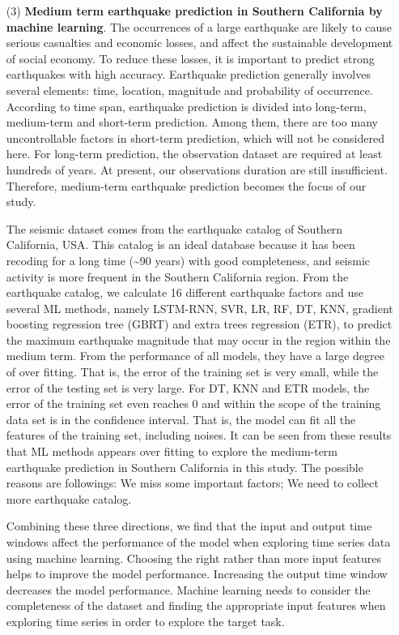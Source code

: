 \begin{enumerate}
  \item[(3)] \textbf{Medium term earthquake prediction in Southern California by machine learning}. The occurrences of a large earthquake are likely to cause serious casualties and economic losses, and affect the sustainable development of social economy. To reduce these losses, it is important to predict strong earthquakes with high accuracy. Earthquake prediction generally involves several elements: time, location, magnitude and probability of occurrence. According to time span, earthquake prediction is divided into long-term, medium-term and short-term prediction. Among them, there are too many uncontrollable factors in short-term prediction, which will not be considered here. For long-term prediction, the observation dataset are required at least hundreds of years. At present, our observations duration are still insufficient. Therefore, medium-term earthquake prediction becomes the focus of our study.

  The seismic dataset comes from the earthquake catalog of Southern California, USA. This catalog is an ideal database because it has been recoding for a long time (\sim 90 years) with good completeness, and seismic activity is more frequent in the Southern California region. From the earthquake catalog, we calculate 16 different earthquake factors and use several ML methods, namely LSTM-RNN, SVR, LR, RF, DT, KNN, gradient boosting regression tree (GBRT) and extra trees regression (ETR), to predict the maximum earthquake magnitude that may occur in the region within the medium term. From the performance of all models, they have a large degree of over fitting. That is, the error of the training set is very small, while the error of the testing set is very large. For DT, KNN and ETR models, the error of the training set even reaches 0 and within the scope of the training data set is in the confidence interval. That is, the model can fit all the features of the training set, including noises. It can be seen from these results that ML methods appears over fitting to explore the medium-term earthquake prediction in Southern California in this study. The possible reasons are followings: We miss some important factors; We need to collect more earthquake catalog.

  Combining these three directions, we find that the input and output time windows affect the performance of the model when exploring time series data using machine learning. Choosing the right rather than more input features helps to improve the model performance. Increasing the output time window decreases the model performance. Machine learning needs to consider the completeness of the dataset and finding the appropriate input features when exploring time series in order to explore the target task.

\end{enumerate}
